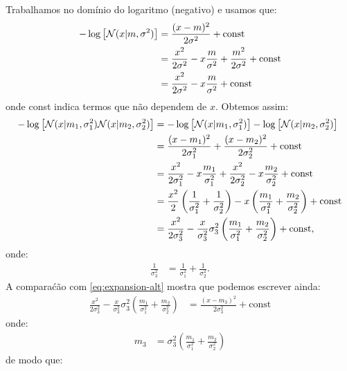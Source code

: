 \begin{exenumerate}
\begin{solution}
        Trabalhamos no dom\'inio do logaritmo (negativo) e usamos que:
        \begin{align}
            -\log \left[\mathcal{N}(x | m, \sigma^2)\right] & = \frac{ (x-m)^2 }{2 \sigma^2} + \text{const} \\
            & = \frac{ x^2}{2\sigma^2} - x \frac{m}{\sigma^2} + \frac{m^2}{2\sigma^2} + \text{const} \\
            & = \frac{ x^2}{2\sigma^2} - x \frac{m}{\sigma^2} +  \text{const} \label{eq:expansion-alt}
        \end{align}
        onde const indica termos que n\~ao dependem de $x$. Obtemos assim:
        \begin{align}
            -\log \left[\mathcal{N}(x | m_1, \sigma_1^2) \mathcal{N}(x | m_2, \sigma_2^2) \right]  & = -\log \left[\mathcal{N}(x | m_1, \sigma_1^2)\right]-\log \left[ \mathcal{N}(x | m_2, \sigma_2^2) \right]\\
            &= \frac{ (x-m_1)^2 }{2 \sigma_1^2} + \frac{ (x-m_2)^2 }{2 \sigma_2^2} + \text{const}\\
            &= \frac{ x^2}{2\sigma_1^2} - x \frac{m_1}{\sigma_1^2} + \frac{ x^2}{2\sigma_2^2} - x \frac{m_2}{\sigma_2^2} + \text{const}\\
            &= \frac{x^2}{2} \left(\frac{1}{\sigma_1^2}+\frac{1}{\sigma_2^2}\right) -x \left( \frac{m_1}{\sigma_1^2}+\frac{m_2}{\sigma_2^2}\right) + \text{const}\\
            &=  \frac{x^2}{2 \sigma_3^2} - \frac{x}{\sigma_3^2} \sigma_3^2\left( \frac{m_1}{\sigma_1^2}+\frac{m_2}{\sigma_2^2}\right) + \text{const},
        \end{align}
        onde:
        \begin{align}
            \frac{1}{\sigma_3^2} &= \frac{1}{\sigma_1^2}+\frac{1}{\sigma_2^2}.
        \end{align}
        A compara\'c\~ao com \eqref{eq:expansion-alt} mostra que podemos escrever ainda:
        \begin{align}
            \frac{x^2}{2 \sigma_3^2} - \frac{x}{\sigma_3^2} \sigma_3^2\left( \frac{m_1}{\sigma_1^2}+\frac{m_2}{\sigma_2^2}\right) &=  \frac{ (x-m_3)^2 }{2 \sigma_3^2} + \text{const}
        \end{align}
        onde:
        \begin{align}
            m_3 & =  \sigma_3^2\left( \frac{m_1}{\sigma_1^2}+\frac{m_2}{\sigma_2^2}\right)
        \end{align}
        de modo que:
        \begin{align}

\end{align}
\end{solution}
\end{exenumerate}
